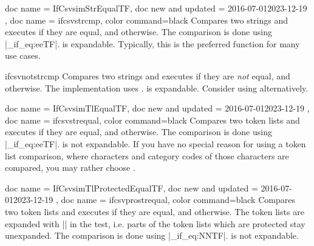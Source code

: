 \documentclass[a4paper,11pt]{ltxdoc}
\begin{document}
\begin{docCommands}[
      doc parameter = \marg{string A}\marg{string B}\marg{true}\marg{false}
    ]
  {
    { doc name = IfCsvsimStrEqualTF, doc new and updated = {2016-07-01}{2023-12-19} },
    { doc name = ifcsvstrcmp, color command=black }
  }
  Compares two strings and executes  if they are equal, and  otherwise.
  The comparison is done using |\str_if_eq:eeTF|.
   is expandable.
  Typically, this is the preferred function for many use cases.
\end{docCommands}


\begin{docCommand}[doc new and updated={2016-07-01}{2021-06-28},color command=black]{ifcsvnotstrcmp}{}
  Compares two strings and executes  if they are \emph{not} equal, and  otherwise.
  The implementation uses .
   is expandable.
  Consider using  alternatively.
\end{docCommand}


\begin{docCommands}[
      doc parameter = \marg{token list A}\marg{token list B}\marg{true}\marg{false}
    ]
  {
    { doc name = IfCsvsimTlEqualTF, doc new and updated = {2016-07-01}{2023-12-19} },
    { doc name = ifcsvstrequal, color command=black }
  }
  Compares two token lists and executes  if they are equal, and  otherwise.
  The comparison is done using |\tl_if_eq:eeTF|.
   is not expandable.
  If you have no special reason for using a token list comparison, where
  characters and category codes of those characters are compared, you may
  rather choose .
\end{docCommands}



\begin{docCommands}[
      doc parameter = \marg{token list A}\marg{token list B}\marg{true}\marg{false}
    ]
  {
    { doc name = IfCsvsimTlProtectedEqualTF, doc new and updated = {2016-07-01}{2023-12-19} },
    { doc name = ifcsvprostrequal, color command=black }
  }
  Compares two token lists and executes  if they are equal, and  otherwise.
  The token lists are expanded with |\protected@edef|
  in the test, i.e. parts of the
  token lists which are protected stay unexpanded.
  The comparison is done using |\tl_if_eq:NNTF|.
   is not expandable.
\end{docCommands}
\end{document}
